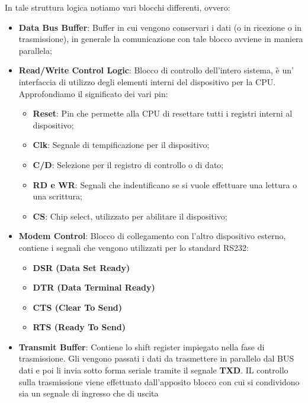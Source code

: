 In tale struttura logica notiamo vari blocchi differenti, ovvero:
\begin{itemize}
    \item \textbf{Data Bus Buffer}: Buffer in cui vengono conservari i dati (o in ricezione o in trasmissione), in generale la comunicazione con tale blocco avviene in maniera parallela;
    \item \textbf{Read/Write Control Logic}: Blocco di controllo dell'intero sistema, è un' interfaccia di utilizzo degli elementi interni del dispositivo per la CPU. Approfondiamo il significato dei vari pin:
    \begin{itemize}
        \item \textbf{Reset}: Pin che permette alla CPU di resettare tutti i registri interni al dispositivo;
        \item \textbf{Clk}: Segnale di tempificazione per il dispositivo;
        \item \textbf{C/D}: Selezione per il registro di controllo o di dato;
        \item \textbf{RD e WR}: Segnali che indentificano se si vuole effettuare una lettura o una scrittura;
        \item \textbf{CS}: Chip select, utilizzato per abilitare il dispositivo;
    \end{itemize} 
    \item \textbf{Modem Control}: Blocco di collegamento con l'altro dispositivo esterno, contiene i segnali che vengono utilizzati per lo standard RS232:
    \begin{itemize}
        \item \textbf{DSR (Data Set Ready)}
        \item \textbf{DTR (Data Terminal Ready)}
        \item \textbf{CTS (Clear To Send)}
        \item \textbf{RTS (Ready To Send)}
    \end{itemize}
    \item \textbf{Transmit Buffer}: Contiene lo shift register impiegato nella fase di trasmissione. Gli vengono passati i dati da trasmettere in parallelo dal BUS dati e poi li invia sotto forma seriale tramite il segnale \textbf{TXD}. IL controllo sulla trasmissione viene effettuato dall'apposito blocco con cui si condividono sia un segnale di ingresso che di uscita
    

\end{itemize}
